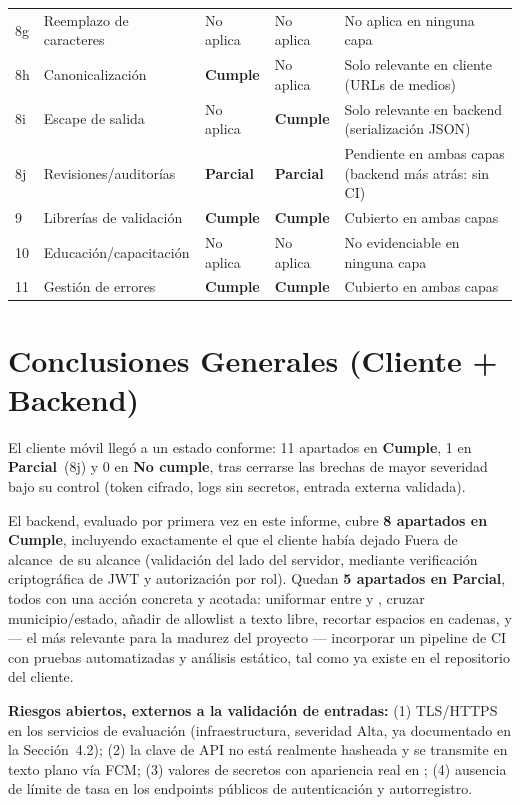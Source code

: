 \documentclass[11pt,a4paper]{article}
\newcommand{\Cumple}{\textcolor{cumpleColor}{\textbf{Cumple}}}
\newcommand{\Parcial}{\textcolor{parcialColor}{\textbf{Parcial}}}
\newcommand{\NoAplica}{\textcolor{noaplicaColor}{No aplica}}
\newcommand{\Fuera}{\textcolor{fueraColor}{Fuera de alcance}}
\newcommand{\NoCumple}{\textcolor{nocumpleColor}{\textbf{No cumple}}}
\begin{document}
\begin{longtable}{p{0.5cm}p{4cm}p{2.3cm}p{2.3cm}p{5cm}}
8g & Reemplazo de caracteres & \NoAplica & \NoAplica & No aplica en ninguna capa \\
8h & Canonicalización & \Cumple & \NoAplica & Solo relevante en cliente (URLs de medios) \\
8i & Escape de salida & \NoAplica & \Cumple & Solo relevante en backend (serialización JSON) \\
8j & Revisiones/auditorías & \Parcial & \Parcial & Pendiente en ambas capas (backend más atrás: sin CI) \\
9 & Librerías de validación & \Cumple & \Cumple & Cubierto en ambas capas \\
10 & Educación/capacitación & \NoAplica & \NoAplica & No evidenciable en ninguna capa \\
11 & Gestión de errores & \Cumple & \Cumple & Cubierto en ambas capas \\
\bottomrule
\end{longtable}

\section{Conclusiones Generales (Cliente + Backend)}

El cliente móvil llegó a un estado conforme: 11 apartados en \Cumple, 1 en \Parcial\ (8j) y 0 en \NoCumple, tras cerrarse las brechas de mayor severidad bajo su control (token cifrado, logs sin secretos, entrada externa validada).

El backend, evaluado por primera vez en este informe, cubre \textbf{8 apartados en \Cumple}, incluyendo exactamente el que el cliente había dejado \Fuera\ de su alcance (validación del lado del servidor, mediante verificación criptográfica de JWT y autorización por rol). Quedan \textbf{5 apartados en \Parcial}, todos con una acción concreta y acotada: uniformar \texttt{} entre \texttt{} y \texttt{}, cruzar municipio/estado, añadir \texttt{} de allowlist a texto libre, recortar espacios en cadenas, y --- el más relevante para la madurez del proyecto --- incorporar un pipeline de CI con pruebas automatizadas y análisis estático, tal como ya existe en el repositorio del cliente.

\textbf{Riesgos abiertos, externos a la validación de entradas:} (1) TLS/HTTPS en los servicios de evaluación (infraestructura, severidad Alta, ya documentado en la Sección~4.2); (2) la clave de API no está realmente hasheada y se transmite en texto plano vía FCM; (3) valores de secretos con apariencia real en \texttt{}; (4) ausencia de límite de tasa en los endpoints públicos de autenticación y autorregistro.
\end{document}
